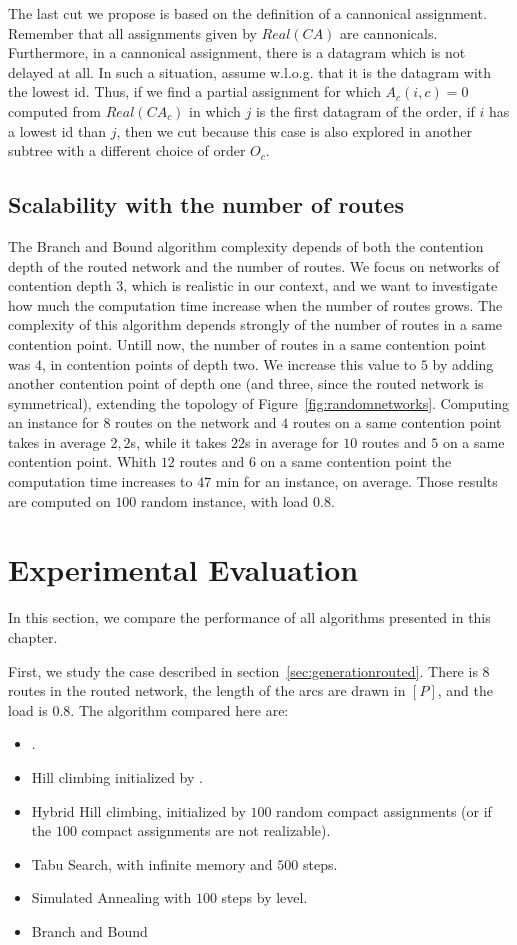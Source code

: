 The last cut we propose is based on the definition of a cannonical assignment. Remember that all assignments given by $Real(CA)$ are cannonicals. Furthermore, in a cannonical assignment, there is a datagram which is not delayed at all. In such a situation, assume w.l.o.g. that it is the datagram with the lowest id. Thus, if we find a partial assignment for which $A_{c}(i,c) = 0$ computed from $Real(CA_c)$ in which $j$ is the first datagram of the order, if $i$ has a lowest id than $j$, then we cut because this case is also explored in another subtree with a different choice of order $O_c$.

\subsection{Scalability with the number of routes}

The Branch and Bound algorithm complexity depends of both the contention depth of the routed network and the number of routes. We focus on networks of contention depth $3$, which is realistic in our context, and we want to investigate how much the computation time increase when the number of routes grows. The complexity of this algorithm depends strongly of the number of routes in a same contention point. Untill now, the number of routes in a same contention point was $4$, in contention points of depth two. We increase this value to $5$ by adding another contention point of depth one (and three, since the routed network is symmetrical), extending the topology of Figure~\ref{fig:randomnetworks}. Computing an instance for $8$ routes on the network and $4$ routes on a same contention point takes in average $2,2$s, while it takes $22$s in average for $10$ routes and $5$ on a same contention point. Whith $12$ routes and $6$ on a same contention point the computation time increases to $47$ min for an instance, on average. Those results are computed on $100$ random instance, with load $0.8$.


\section{Experimental Evaluation}
\label{sec:evalperfspall}
In this section, we compare the performance of all algorithms presented in this chapter.

 First, we study the case described in section~\ref{sec:generationrouted}. There is $8$ routes in the routed network, the length of the arcs are drawn in $[P]$, and the load is $0.8$.
 The algorithm compared here are:
 \begin{itemize}
  \item \hybridgreedynormalized.
  \item Hill climbing initialized by \hgn.
  \item Hybrid Hill climbing, initialized by $100$ random compact assignments (or \hgn if the $100$ compact assignments are not realizable).
  \item Tabu Search, with infinite memory and $500$ steps.
  \item Simulated Annealing with $100$ steps by level.
  \item Branch and Bound
\end{itemize}

